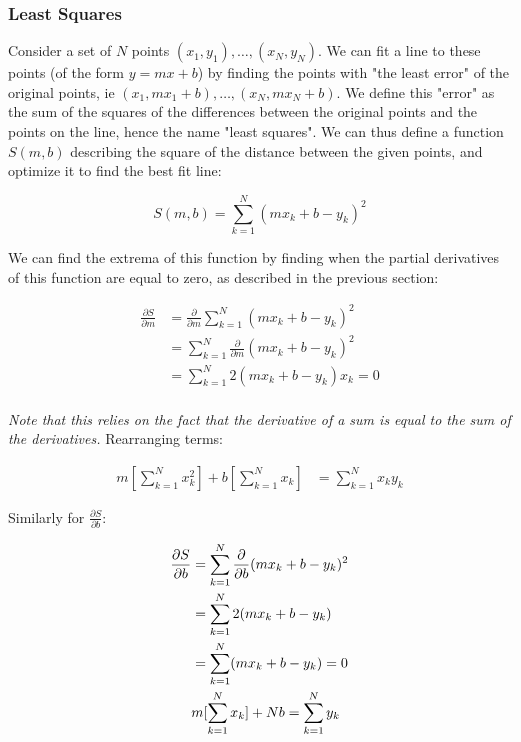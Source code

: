 \documentclass[12pt]{article}
\begin{document}
{\subsubsection{Least Squares}

Consider a set of $N$ points $(x_1, y_1), \dots, (x_N, y_N)$. We can fit a line to these points (of the form $y = mx+b$) by finding the points with "the least error" of the original points, ie $(x_1, mx_1+b), \dots, (x_N, mx_N+b)$. We define this "error" as the sum of the squares of the differences between the original points and the points on the line, hence the name "least squares". We can thus define a function $S(m,b)$ describing the square of the distance between the given points, and optimize it to find the best fit line:

\begin{equation}\label{eq:least_squares}
    S(m, b) = \sum_{k=1}^N (mx_k + b - y_k)^2 
\end{equation}

We can find the extrema of this function by finding when the partial derivatives of this function are equal to zero, as described in the previous section:

\begin{align*}
    \frac{\partial S}{\partial m} &= \frac{\partial }{\partial m} \sum_{k=1}^N (mx_k + b - y_k)^2\\
    &= \sum_{k=1}^N \frac{\partial }{\partial m} (mx_k + b - y_k)^2\\
    &= \sum_{k=1}^N 2(mx_k + b - y_k)x_k = 0\\
\end{align*}

\textit{Note that this relies on the fact that the derivative of a sum is equal to the sum of the derivatives.} Rearranging terms:

\begin{align*}
    m[\sum_{k=1}^N x_k^2] + b[\sum_{k=1}^N x_k] &= \sum_{k=1}^N x_k y_k
\end{align*}

Similarly for $\frac{\partial S}{\partial b}$:

\begin{align*}
    \frac{\partial S}{\partial b} &= \sum_{k=1}^N \frac{\partial }{\partial b}(mx_k + b - y_k)^2\\
    &= \sum_{k=1}^N 2(mx_k + b - y_k)\\
    &=\sum_{k=1}^N (mx_k + b - y_k)=0\\
    &m[\sum_{k=1}^N x_k] + Nb = \sum_{k=1}^N y_k
\end{align*}

}
\end{document}
